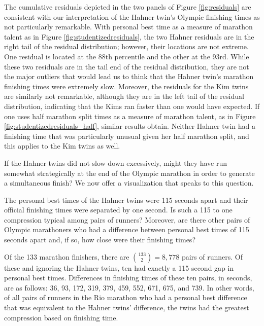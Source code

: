 \documentclass[12pt,titlepage]{article}
\begin{document}
The cumulative residuals depicted in the two panels of Figure
\ref{fig:residuals} are consistent with our interpretation of the
Hahner twin's Olympic finishing times as not particularly remarkable.
With personal best time as a measure of marathon talent as in Figure
\ref{fig:studentizedresiduals}, the two Hahner residuals are in the
right tail of the residual distribution; however, their locations are
not extreme.  One residual is located at the 88th percentile and the
other at the 93rd.  While these two residuals are in the tail end of
the residual distribution, they are not the major outliers that would
lead us to think that the Hahner twin's marathon finishing times were
extremely slow.  Moreover, the residuals for the Kim twins are
similarly not remarkable, although they are in the left tail of the
residual distribution, indicating that the Kims ran faster than one
would have expected.  If one uses half marathon split times as a
measure of marathon talent, as in Figure
\ref{fig:studentizedresiduals_half}, similar results obtain.  Neither
Hahner twin had a finishing time that was particularly unusual given
her half marathon split, and this applies to the Kim twins as well.

If the Hahner twins did not slow down excessively, might they have run
somewhat strategically at the end of the Olympic marathon in order to
generate a simultaneous finish?  We now offer a visualization that
speaks to this question.

The personal best times of the Hahner twins were 115 seconds apart and
their official finishing times were separated by one second.  Is such
a 115 to one compression typical among pairs of runners?  Moreover,
are there other pairs of Olympic marathoners who had a difference
between personal best times of 115 seconds apart and, if so, how close
were their finishing times?

Of the 133 marathon finishers, there are $\binom{133}{2} = 8,778$
pairs of runners.  Of these and ignoring the Hahner twins, ten had
exactly a 115 second gap in personal best times.  Differences in
finishing times of these ten pairs, in seconds, are as follows: 36,
93, 172, 319, 379, 459, 552, 671, 675, and 739.  In other words, of
all pairs of runners in the Rio marathon who had a personal best
difference that was equivalent to the Hahner twins' difference, the
twins had the greatest compression based on finishing time.
\end{document}

